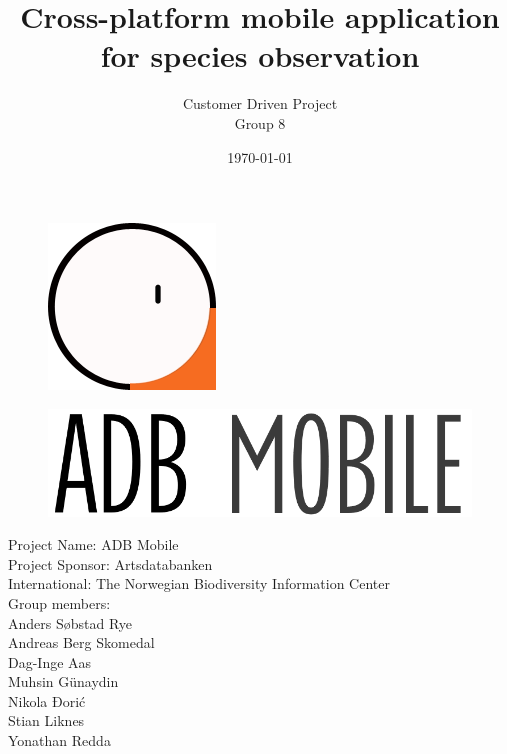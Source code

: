 \documentclass[a4paper]{article}
\begin{document}
  \title{Cross-platform mobile application \\ for species observation}
  
  \begin{figure}
    \centering
    \includegraphics[scale=1.0]{Logo_.png}
  \end{figure}
  \begin{figure}
    \centering
    \includegraphics[scale=0.5]{ADB_Mobile_Logo.png}
  \end{figure}
	\author{Customer Driven Project \\ Group 8}
	\date{\today}
	\maketitle
	\thispagestyle{empty}
	\pagebreak

	\pagestyle{empty}
	\begin{center}
		Project Name: ADB Mobile \\
		Project Sponsor: Artsdatabanken \\
		International: The Norwegian Biodiversity Information Center \\
    Group members: \\
    Anders Søbstad Rye\\
    Andreas Berg Skomedal\\
    Dag-Inge Aas\\
    Muhsin Günaydin\\
    Nikola Đorić\\
    Stian Liknes\\
    Yonathan Redda
	\end{center}
	\newpage

	\tableofcontents
	\listoffigures
	\listoftables
\end{document}
